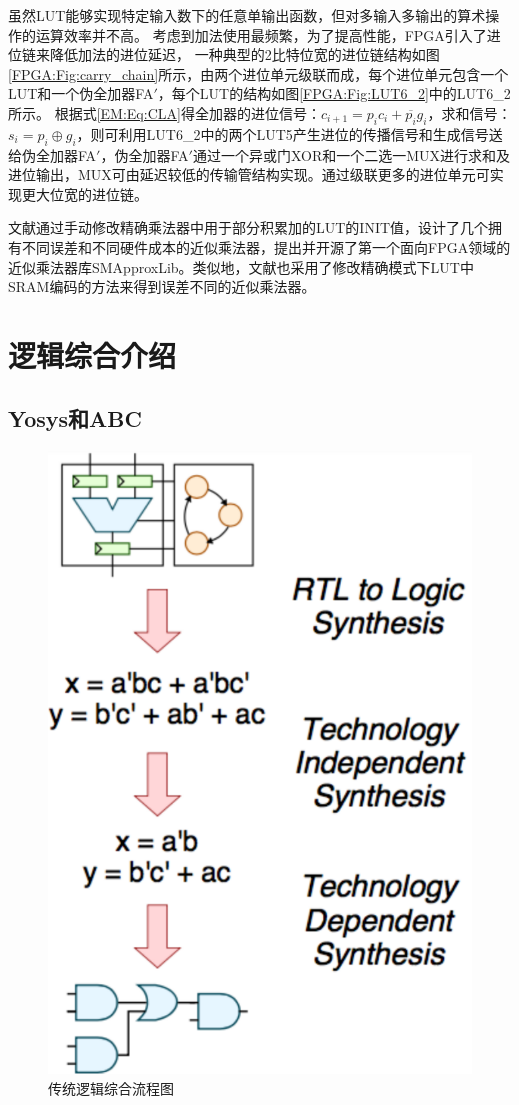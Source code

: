 虽然LUT能够实现特定输入数下的任意单输出函数，但对多输入多输出的算术操作的运算效率并不高。
考虑到加法使用最频繁，为了提高性能，FPGA引入了进位链来降低加法的进位延迟，
一种典型的2比特位宽的进位链结构如图\ref{FPGA:Fig:carry_chain}所示，由两个进位单元级联而成，每个进位单元包含一个LUT和一个伪全加器FA$'$，每个LUT的结构如图\ref{FPGA:Fig:LUT6_2}中的LUT6\_2所示。
根据式\eqref{EM:Eq:CLA}得全加器的进位信号：$c_{i+1} = p_i c_i  + \overline{p_i} g_i$，求和信号：$s_{i} = p_i \oplus g_i$，则可利用LUT6\_2中的两个LUT5产生进位的传播信号和生成信号送给伪全加器FA$'$，伪全加器FA$'$通过一个异或门XOR和一个二选一MUX进行求和及进位输出，MUX可由延迟较低的传输管结构实现。通过级联更多的进位单元可实现更大位宽的进位链。

文献\cite{AC:AM:FPGA:SMApproxLib}通过手动修改精确乘法器中用于部分积累加的LUT的INIT值，设计了几个拥有不同误差和不同硬件成本的近似乘法器，提出并开源了第一个面向FPGA领域的近似乘法器库SMApproxLib。类似地，文献\cite{AC:AM:FPGA:CaCc,AC:AM:FPGA:FPT22,AC:AM:FPGA:TCAD22}也采用了修改精确模式下LUT中SRAM编码的方法来得到误差不同的近似乘法器。



\section{逻辑综合介绍}


\subsection{Yosys和ABC}

\begin{figure}[!htbp]
    \centering
    \includegraphics[width=0.4\linewidth]{./figs/LS-flow.png}
    \caption{传统逻辑综合流程图}
    \label{LS:flow}
\end{figure}

